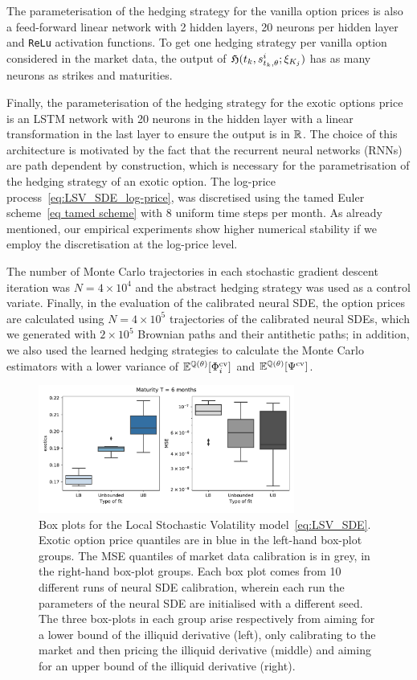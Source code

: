 The parameterisation of the hedging strategy for the vanilla option prices is also a feed-forward
linear network with 2 hidden layers, 20 neurons per hidden layer and \texttt{ReLu} activation functions. To get one hedging strategy per vanilla option 
considered in the market data, the output of $\mathfrak{H}(t_k, s_{t_k, \theta}^{i}; \xi_{K_j})$ has as many neurons as strikes and maturities.

Finally, the parameterisation of the hedging strategy for the exotic options price is an LSTM network \cite{Hochreiter1997LongMemory} with 20 neurons in the hidden layer with a linear transformation in the last layer to ensure the output is in $\mathbb{R}$. The choice of this architecture is motivated by the fact that the recurrent neural networks (RNNs) are path dependent by construction, which is necessary for the parametrisation of the hedging strategy of an exotic option. 
The log-price process~\eqref{eq:LSV_SDE_log-price}, was discretised using the tamed Euler scheme~\eqref{eq tamed scheme} with 8 uniform time steps per month. As already mentioned, our empirical experiments show higher numerical stability if we employ the discretisation at the log-price level.
 
The number of Monte Carlo trajectories in each stochastic gradient descent iteration was $N=4\times 10^4$ and the abstract hedging strategy was used as a control variate. Finally, in the evaluation of the calibrated neural SDE, the option prices are calculated using $N = 4\times 10^5$ trajectories of the calibrated neural SDEs, which we generated with $2\times 10^5$ Brownian paths and their antithetic paths; in addition, we also used the learned hedging strategies to calculate the Monte Carlo estimators with a lower variance of $\mathbb{E}^{\mathbb{Q}(\theta)}[\Phi_i^{\textup{cv}}]$ and $\mathbb{E}^{\mathbb{Q}(\theta)}[\Psi^{\textup{cv}}]$.          

\begin{figure}[H]
    \centering
    \includegraphics[clip,width=0.75\textwidth]{content/reschap1/Figures/figures_SPX/lookback_bounds_mse.pdf} 
  \caption{Box plots for the Local Stochastic Volatility model~\eqref{eq:LSV_SDE}. Exotic option price quantiles are in blue in the left-hand box-plot groups. The MSE quantiles of market data calibration is in grey, in the right-hand box-plot groups. Each box plot comes from 10 different runs of neural SDE calibration, wherein each run the parameters of the neural SDE are initialised with a different seed. The three box-plots in each group arise respectively from aiming for a lower bound of the illiquid derivative (left), only calibrating to the market and then pricing the illiquid derivative (middle) and aiming for an upper bound of the illiquid derivative (right).}\label{fig:SPX LSV boxplots}
\end{figure}


